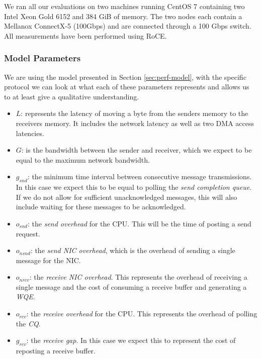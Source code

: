 We ran all our evaluations on two machines running CentOS 7 containing two Intel Xeon Gold 6152 and 384 GiB of memory.
The two nodes each contain a Mellanox ConnectX-5 (100Gbps) and are connected through a 100 Gbps switch. All measurements
have been performed using RoCE.


\subsubsection{Model Parameters}


We are using the model presented in Section \ref{sec:perf-model}, with the specific protocol 
we can look at what each of these parameters represents and allows us to at least give a qualitative understanding.


\begin{itemize}
  \item $L$: represents the latency of moving a byte from the senders memory to the receivers memory. It includes the 
    network latency as well as two DMA access latencies.
  \item $G$: is the bandwidth between the sender and receiver, which we expect to be equal to the maximum network bandwidth.
  \item $g_{snd}$: the minimum time interval between consecutive message transmissions. In this case we expect this to be 
    equal to polling the \emph{send completion queue}. If we do not allow for sufficient unacknowledged messages, this will
    also include waiting for these messages to be acknowledged.
  \item $o_{snd}$: the \emph{send overhead} for the CPU. This will be the time of posting a send request.
  \item $o_{nsnd}$: the \emph{send NIC overhead}, which is the overhead of sending a single message for the NIC.
  \item $o_{nrcv}$: the \emph{receive NIC overhead}. This represents the overhead of receiving a single message and the cost of 
    consuming a receive buffer and generating a \emph{WQE}.
  \item $o_{rcv}$: the \emph{receive overhead} for the CPU. This represents the overhead of polling the \emph{CQ}.
  \item $g_{rcv}$: the \emph{receive gap}. In this case we expect this to represent the cost of reposting a receive buffer.
\end{itemize}


